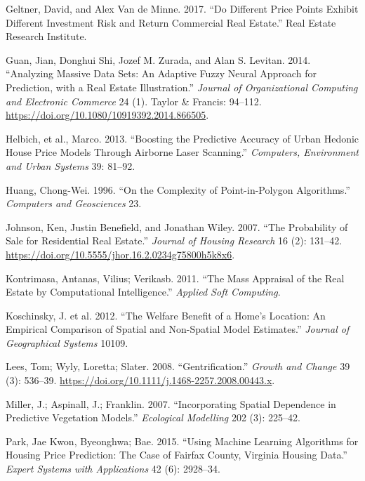 \documentclass[12pt,]{article}
\begin{document}
\leavevmode\hypertarget{ref-Geltner2017}{}%
Geltner, David, and Alex Van de Minne. 2017. ``Do Different Price Points
Exhibit Different Investment Risk and Return Commercial Real Estate.''
Real Estate Research Institute.

\leavevmode\hypertarget{ref-Guan2014}{}%
Guan, Jian, Donghui Shi, Jozef M. Zurada, and Alan S. Levitan. 2014.
``Analyzing Massive Data Sets: An Adaptive Fuzzy Neural Approach for
Prediction, with a Real Estate Illustration.'' \emph{Journal of
Organizational Computing and Electronic Commerce} 24 (1). Taylor \&
Francis: 94--112. \url{https://doi.org/10.1080/10919392.2014.866505}.

\leavevmode\hypertarget{ref-Helbich2013}{}%
Helbich, et al., Marco. 2013. ``Boosting the Predictive Accuracy of
Urban Hedonic House Price Models Through Airborne Laser Scanning.''
\emph{Computers, Environment and Urban Systems} 39: 81--92.

\leavevmode\hypertarget{ref-Huang1996}{}%
Huang, Chong-Wei. 1996. ``On the Complexity of Point-in-Polygon
Algorithms.'' \emph{Computers and Geosciences} 23.

\leavevmode\hypertarget{ref-Johnson2007}{}%
Johnson, Ken, Justin Benefield, and Jonathan Wiley. 2007. ``The
Probability of Sale for Residential Real Estate.'' \emph{Journal of
Housing Research} 16 (2): 131--42.
\url{https://doi.org/10.5555/jhor.16.2.0234g75800h5k8x6}.

\leavevmode\hypertarget{ref-Kontrimasa2011}{}%
Kontrimasa, Antanas, Vilius; Verikasb. 2011. ``The Mass Appraisal of the
Real Estate by Computational Intelligence.'' \emph{Applied Soft
Computing}.

\leavevmode\hypertarget{ref-Koschinsky2012}{}%
Koschinsky, J. et al. 2012. ``The Welfare Benefit of a Home's Location:
An Empirical Comparison of Spatial and Non-Spatial Model Estimates.''
\emph{Journal of Geographical Systems} 10109.

\leavevmode\hypertarget{ref-Lees2008}{}%
Lees, Tom; Wyly, Loretta; Slater. 2008. ``Gentrification.'' \emph{Growth
and Change} 39 (3): 536--39.
\url{https://doi.org/10.1111/j.1468-2257.2008.00443.x}.

\leavevmode\hypertarget{ref-Miller2015}{}%
Miller, J.; Aspinall, J.; Franklin. 2007. ``Incorporating Spatial
Dependence in Predictive Vegetation Models.'' \emph{Ecological
Modelling} 202 (3): 225--42.

\leavevmode\hypertarget{ref-Park2015}{}%
Park, Jae Kwon, Byeonghwa; Bae. 2015. ``Using Machine Learning
Algorithms for Housing Price Prediction: The Case of Fairfax County,
Virginia Housing Data.'' \emph{Expert Systems with Applications} 42 (6):
2928--34.
\end{document}
